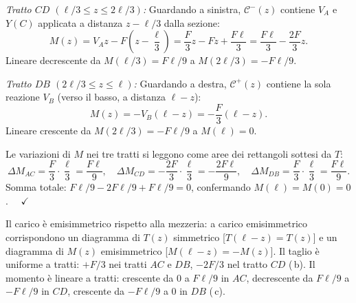 \begin{esempio}
\begin{svolgimento}
		\textit{Tratto $CD$ $(\ell/3 \leq z \leq 2\ell/3)$:}
		Guardando a sinistra, $\mathcal{C}^-(z)$
		contiene $V_A$ e $Y(C)$ applicata a distanza
		$z - \ell/3$ dalla sezione:
		\[
		M(z) = V_A z - F\!\left(z - \frac{\ell}{3}\right)
		= \frac{F}{3}z - F z + \frac{F\ell}{3}
		= \frac{F\ell}{3} - \frac{2F}{3}z.
		\]
		Lineare decrescente da $M(\ell/3) = F\ell/9$
		a $M(2\ell/3) = -F\ell/9$.
		
		\textit{Tratto $DB$ $(2\ell/3 \leq z \leq \ell)$:}
		Guardando a destra, $\mathcal{C}^+(z)$
		contiene la sola reazione $V_B$ (verso il
		basso, a distanza $\ell - z$):
		\[
		M(z) = -V_B(\ell - z) = -\frac{F}{3}(\ell - z).
		\]
		Lineare crescente da $M(2\ell/3) = -F\ell/9$
		a $M(\ell) = 0$.
		
		Le variazioni di $M$ nei tre tratti si leggono
		come aree dei rettangoli sottesi da $T$:
		\[
		\Delta M_{AC} = \frac{F}{3}\cdot\frac{\ell}{3}
		= \frac{F\ell}{9}, \quad
		\Delta M_{CD} = -\frac{2F}{3}\cdot\frac{\ell}{3}
		= -\frac{2F\ell}{9}, \quad
		\Delta M_{DB} = \frac{F}{3}\cdot\frac{\ell}{3}
		= \frac{F\ell}{9}.
		\]
		Somma totale: $F\ell/9 - 2F\ell/9 + F\ell/9 = 0$,
		confermando $M(\ell) = M(0) = 0$. $\quad\checkmark$
		
		\noindent
		Il carico è emisimmetrico rispetto alla mezzeria:
		a carico emisimmetrico corrispondono un diagramma
		di $T(z)$ simmetrico [$T(\ell-z) = T(z)$] e un
		diagramma di $M(z)$ emisimmetrico
		[$M(\ell-z) = -M(z)$]. Il taglio è uniforme a
		tratti: $+F/3$ nei tratti $AC$ e $DB$,
		$-2F/3$ nel tratto $CD$ (\,b). Il momento è lineare
		a tratti: crescente da $0$ a $F\ell/9$ in $AC$,
		decrescente da $F\ell/9$ a $-F\ell/9$ in $CD$,
		crescente da $-F\ell/9$ a $0$ in $DB$ (\,c).
		
	\end{svolgimento}
\end{esempio}


